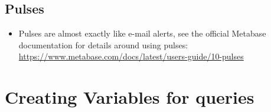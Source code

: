 \documentclass[
]{book}
\providecommand{\tightlist}{%
  \setlength{\itemsep}{0pt}\setlength{\parskip}{0pt}}
\begin{document}
\hypertarget{pulses}{%
\subsection{Pulses}\label{pulses}}

\begin{itemize}
\tightlist
\item
  Pulses are almost exactly like e-mail alerts, see the official Metabase documentation for details around using pulses: \url{https://www.metabase.com/docs/latest/users-guide/10-pulses}
\end{itemize}

\hypertarget{creating-variables-for-queries}{%
\section{Creating Variables for queries}\label{creating-variables-for-queries}}
\end{document}
